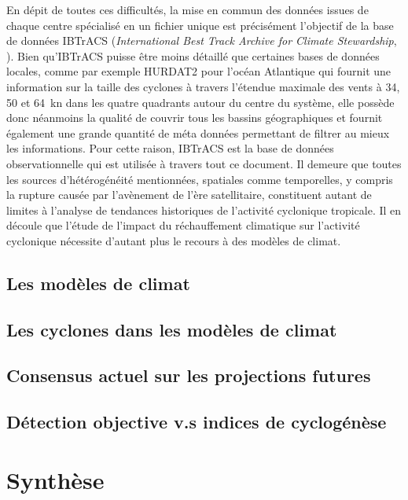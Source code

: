 \documentclass[../main.tex]{subfiles}
\begin{document}
En dépit de toutes ces difficultés, la mise en commun des données issues de chaque centre spécialisé en un fichier unique est précisément l'objectif de la base de données IBTrACS (\textit{International Best Track Archive for Climate Stewardship}, \cite{knapp_international_2010}). Bien qu'IBTrACS puisse être moins détaillé que certaines bases de données locales, comme par exemple HURDAT2 pour l'océan Atlantique \parencite{landsea_atlantic_2013} qui fournit une information sur la taille des
cyclones à travers
l'étendue maximale des vents à \num{34}, \num{50} et \SI{64}{\knot} dans les quatre quadrants autour du centre du système, elle possède donc néanmoins la qualité de couvrir tous les bassins géographiques et fournit également une grande quantité de méta données permettant de filtrer au mieux les informations. Pour cette raison, IBTrACS est la base de données observationnelle qui est utilisée à travers tout ce document. Il demeure que toutes les sources d'hétérogénéité mentionnées, spatiales comme
temporelles, y compris la rupture causée par l'avènement de l'ère satellitaire, constituent autant de limites à l'analyse de tendances historiques de l'activité cyclonique tropicale. Il en découle que l'étude de l'impact du réchauffement climatique sur l'activité cyclonique nécessite d'autant plus le recours à des modèles de climat.

\subsection{Les modèles de climat}

\subsection{Les cyclones dans les modèles de climat}

\cite{manabe_tropical_1970}

\subsection{Consensus actuel sur les projections futures}\label{sec:projections_futures}

\cite{seneviratne_weather_2021}

\subsection{Détection objective v.s indices de cyclogénèse}

\section{Synthèse}
\end{document}
